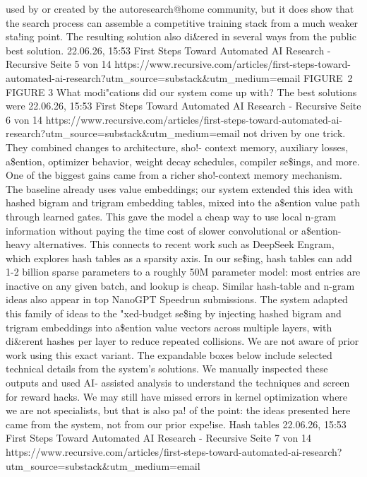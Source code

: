 used by or created by the autoresearch@home community, but it does
show that the search process can assemble a competitive training stack
from a much weaker sta!ing point. The resulting solution also di\&ered
in several ways from the public best solution.
22.06.26, 15:53
First Steps Toward Automated AI Research - Recursive
Seite 5 von 14
https://www.recursive.com/articles/first-steps-toward-automated-ai-research?utm\_source=substack\&utm\_medium=email
FIGURE 2
FIGURE 3
What modi"cations did our system come up with? The best solutions were
22.06.26, 15:53
First Steps Toward Automated AI Research - Recursive
Seite 6 von 14
https://www.recursive.com/articles/first-steps-toward-automated-ai-research?utm\_source=substack\&utm\_medium=email
not driven by one trick. They combined changes to architecture, sho!-
context memory, auxiliary losses, a\$ention, optimizer behavior, weight decay
schedules, compiler se\$ings, and more.
One of the biggest gains came from a richer sho!-context memory mechanism.
The baseline already uses value embeddings; our system extended this
idea with hashed bigram and trigram embedding tables, mixed into the
a\$ention value path through learned gates. This gave the model a cheap
way to use local n-gram information without paying the time cost of slower
convolutional or a\$ention-heavy alternatives.
This connects to recent work such as DeepSeek Engram, which explores
hash tables as a sparsity axis. In our se\$ing, hash tables can add 1-2 billion
sparse parameters to a roughly 50M parameter model: most entries are
inactive on any given batch, and lookup is cheap. Similar hash-table and
n-gram ideas also appear in top NanoGPT Speedrun submissions. The
system adapted this family of ideas to the "xed-budget se\$ing by injecting
hashed bigram and trigram embeddings into a\$ention value vectors across
multiple layers, with di\&erent hashes per layer to reduce repeated collisions.
We are not aware of prior work using this exact variant.
The expandable boxes below include selected technical details from the
system’s solutions. We manually inspected these outputs and used AI-
assisted analysis to understand the techniques and screen for reward hacks.
We may still have missed errors in kernel optimization where we are not
specialists, but that is also pa! of the point: the ideas presented here came
from the system, not from our prior expe!ise.
Hash tables
22.06.26, 15:53
First Steps Toward Automated AI Research - Recursive
Seite 7 von 14
https://www.recursive.com/articles/first-steps-toward-automated-ai-research?utm\_source=substack\&utm\_medium=email
